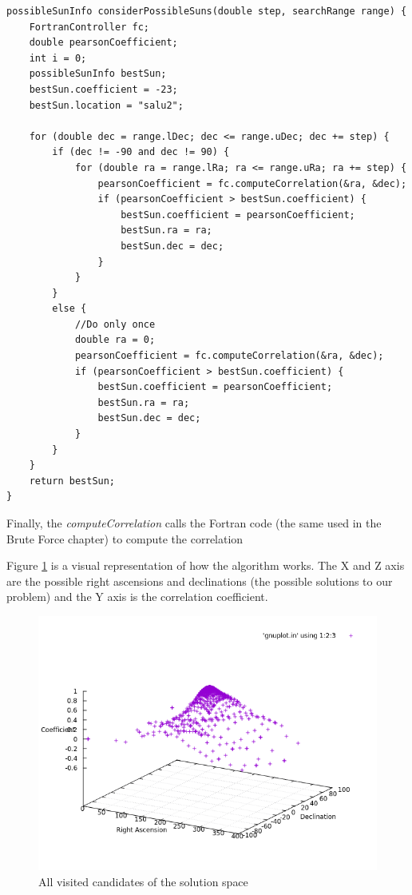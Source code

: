 \begin{minipage}{\linewidth}
	\begin{lstlisting}[style=myCStyle, caption=Iterating over possible locations within the given range]
possibleSunInfo considerPossibleSuns(double step, searchRange range) {
	FortranController fc;
	double pearsonCoefficient;
	int i = 0;
	possibleSunInfo bestSun;
	bestSun.coefficient = -23;
	bestSun.location = "salu2";

	for (double dec = range.lDec; dec <= range.uDec; dec += step) {
		if (dec != -90 and dec != 90) {
			for (double ra = range.lRa; ra <= range.uRa; ra += step) {
				pearsonCoefficient = fc.computeCorrelation(&ra, &dec);
				if (pearsonCoefficient > bestSun.coefficient) {
					bestSun.coefficient = pearsonCoefficient;
					bestSun.ra = ra;
					bestSun.dec = dec;
				}
			}
		}
		else {
			//Do only once
			double ra = 0;
			pearsonCoefficient = fc.computeCorrelation(&ra, &dec);
			if (pearsonCoefficient > bestSun.coefficient) {
				bestSun.coefficient = pearsonCoefficient;
				bestSun.ra = ra;
				bestSun.dec = dec;
			}
		}
	}
	return bestSun;
}\end{lstlisting}
\end{minipage}

Finally, the \textit{computeCorrelation} calls the Fortran code (the same used in the Brute Force chapter) to compute the correlation

Figure \ref{fig:consideredSolutions} is a visual representation of how the algorithm works. The X and Z axis are the possible right ascensions
and declinations (the possible solutions to our problem) and the Y axis is the correlation coefficient.

\begin{figure}[!htb]
	\begin{centering}
		\includegraphics[width=0.5\linewidth]{images/ch6/hillClimbing/resultsAll.png}
		\caption{All visited candidates of the solution space}
		\label{fig:consideredSolutions}
	\end{centering}
\end{figure}

